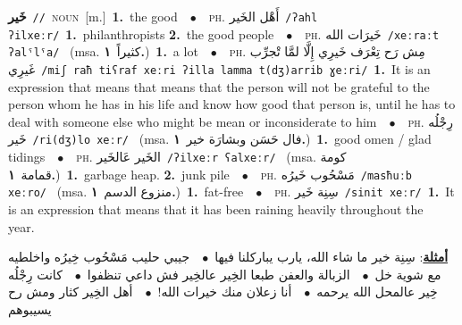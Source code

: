 \documentclass[10pt,a4paper,twoside]{article} %
\begin{document}
\begin{multicols}{2}
{\setlength\topsep{0pt}\textbf{\foreignlanguage{arabic}{خَير}}\ {\color{gray}\texttt{//}\color{black}}\ \textsc{noun}\ [m.]\ \textbf{1.}~the good\ \ $\bullet$\ \ \textsc{ph.} \color{gray} \foreignlanguage{arabic}{أَهْل الخَير}\color{black}\ {\color{gray}\texttt{/{\sffamily ʔahl ʔilxeːr}/}\color{black}}\ \textbf{1.}~philanthropists  \textbf{2.}~the good people\ \ $\bullet$\ \ \textsc{ph.} \color{gray} \foreignlanguage{arabic}{خَيرَات الله}\color{black}\ {\color{gray}\texttt{/{\sffamily xeːraːt ʔalˤlˤa}/}\color{black}}\ \color{gray} (msa. \foreignlanguage{arabic}{كثيراً}~\foreignlanguage{arabic}{\textbf{١.}})\color{black}\ \textbf{1.}~a lot\ \ $\bullet$\ \ \textsc{ph.} \color{gray} \foreignlanguage{arabic}{مِش رَح تِعْرَف خَيرِي إِلَّا لمَّا تْجرِّب غَيرِي}\color{black}\ {\color{gray}\texttt{/{\sffamily miʃ raħ tiʕraf xeːri ʔilla lamma t(dʒ)arrib ɣeːri}/}\color{black}}\ \textbf{1.}~It is an expression that means that means that the person will not be grateful to the person whom he has in his life and know how good that person is, until he has to deal with someone else who might be mean or inconsiderate to him\ \ $\bullet$\ \ \textsc{ph.} \color{gray} \foreignlanguage{arabic}{رِجْلُه خَير}\color{black}\ {\color{gray}\texttt{/{\sffamily ri(dʒ)lo xeːr}/}\color{black}}\ \color{gray} (msa. \foreignlanguage{arabic}{فال حَسَن وبشارَة خير}~\foreignlanguage{arabic}{\textbf{١.}})\color{black}\ \textbf{1.}~good omen / glad tidings\ \ $\bullet$\ \ \textsc{ph.} \color{gray} \foreignlanguage{arabic}{الخَير عَالخَير}\color{black}\ {\color{gray}\texttt{/{\sffamily ʔilxeːr ʕalxeːr}/}\color{black}}\ \color{gray} (msa. \foreignlanguage{arabic}{كومة قمامة}~\foreignlanguage{arabic}{\textbf{١.}})\color{black}\ \textbf{1.}~garbage heap.  \textbf{2.}~junk pile\ \ $\bullet$\ \ \textsc{ph.} \color{gray} \foreignlanguage{arabic}{مَسْحُوب خَيرُه}\color{black}\ {\color{gray}\texttt{/{\sffamily masħuːb xeːro}/}\color{black}}\ \color{gray} (msa. \foreignlanguage{arabic}{منزوع الدسم}~\foreignlanguage{arabic}{\textbf{١.}})\color{black}\ \textbf{1.}~fat-free\ \ $\bullet$\ \ \textsc{ph.} \color{gray} \foreignlanguage{arabic}{سِنِة خَير}\color{black}\ {\color{gray}\texttt{/{\sffamily sinit xeːr}/}\color{black}}\ \textbf{1.}~It is an expression that means that it has been raining heavily throughout the year.\  \begin{flushright}\color{gray}\foreignlanguage{arabic}{\textbf{\underline{\foreignlanguage{arabic}{أمثلة}}}: سِنِة خير ما شاء الله، يارب يباركلنا فيها\ $\bullet$\ \  جيبي حليب مَسْحُوب خِيرُه واخلطيه مع شوية خل\ $\bullet$\ \  الزبالة والعفن طبعا الخِير عالخِير فش داعي تنظفوا\ $\bullet$\ \  كانت رِجْلُه خِير عالمحل الله يرحمه\ $\bullet$\ \  أنا زعلان منك خيرات الله!\ $\bullet$\ \  أهل الخِير كثار ومش رح يسيبوهم}\end{flushright}\color{black}} \vspace{2mm}


\end{multicols}
\end{document}
